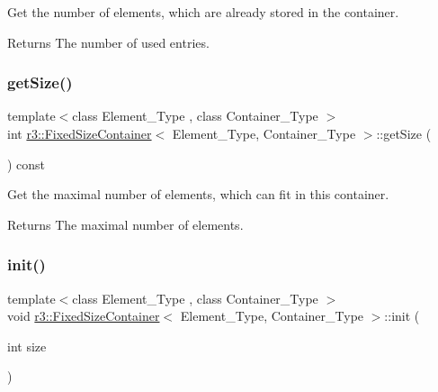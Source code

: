 Get the number of elements, which are already stored in the container. 

\begin{DoxyReturn}{Returns}
The number of used entries. 
\end{DoxyReturn}
\mbox{\label{classr3_1_1_fixed_size_container_a984b90ac15df32a41011e665e3059e17}} 
\subsubsection{\texorpdfstring{get\+Size()}{getSize()}}
{\footnotesize\ttfamily template$<$class Element\+\_\+\+Type , class Container\+\_\+\+Type $>$ \\
int \mbox{\hyperlink{classr3_1_1_fixed_size_container}{r3\+::\+Fixed\+Size\+Container}}$<$ Element\+\_\+\+Type, Container\+\_\+\+Type $>$\+::get\+Size (\begin{DoxyParamCaption}{ }\end{DoxyParamCaption}) const}



Get the maximal number of elements, which can fit in this container. 

\begin{DoxyReturn}{Returns}
The maximal number of elements. 
\end{DoxyReturn}
\mbox{\label{classr3_1_1_fixed_size_container_a75dddd29ba901e97ba6133a6c388b357}} 
\subsubsection{\texorpdfstring{init()}{init()}}
{\footnotesize\ttfamily template$<$class Element\+\_\+\+Type , class Container\+\_\+\+Type $>$ \\
void \mbox{\hyperlink{classr3_1_1_fixed_size_container}{r3\+::\+Fixed\+Size\+Container}}$<$ Element\+\_\+\+Type, Container\+\_\+\+Type $>$\+::init (\begin{DoxyParamCaption}\item[{int}]{size }\end{DoxyParamCaption})}



